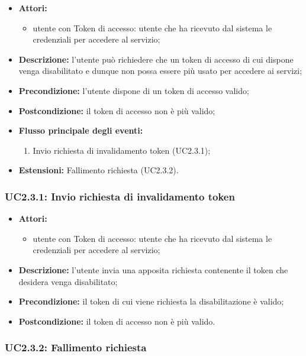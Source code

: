 \begin{itemize}
	\item \textbf{Attori:}
	\begin{itemize}
		\item utente con Token di accesso: utente che ha ricevuto dal sistema le credenziali per accedere al servizio;
	\end{itemize}
	\item \textbf{Descrizione:} l'utente può richiedere che un token di accesso di cui dispone venga disabilitato e dunque non possa essere più usato per accedere ai servizi;
	\item \textbf{Precondizione:} l'utente dispone di un token di accesso valido;
	\item \textbf{Postcondizione:} il token di accesso non è più valido;
	\item \textbf{Flusso principale degli eventi:}
	\begin{enumerate}
		\item Invio richiesta di invalidamento token (UC2.3.1);
	\end{enumerate}
	\item \textbf{Estensioni:} Fallimento richiesta (UC2.3.2).
\end{itemize}


\subsubsection{UC2.3.1: Invio richiesta di invalidamento token}

\begin{itemize}
	\item \textbf{Attori:}
	\begin{itemize}
		\item utente con Token di accesso: utente che ha ricevuto dal sistema le credenziali per accedere al servizio;
	\end{itemize}
	\item \textbf{Descrizione:} l'utente invia una apposita richiesta contenente il token che desidera venga disabilitato;
	\item \textbf{Precondizione:} il token di cui viene richiesta la disabilitazione è valido;
	\item \textbf{Postcondizione:} il token di accesso non è più valido.
\end{itemize}

\subsubsection{UC2.3.2: Fallimento richiesta}

